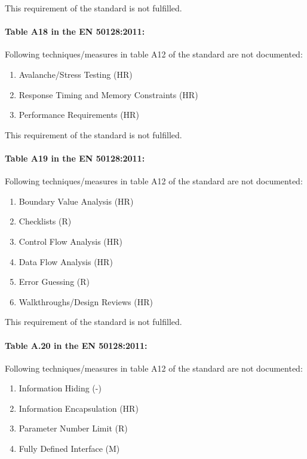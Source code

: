 This requirement of the standard is not fulfilled.

\paragraph{Table A18 in the EN 50128:2011:}
Following techniques/measures in table A12 of the standard are not documented:

\begin{enumerate}
\item	Avalanche/Stress Testing (HR)
\item	Response Timing and Memory Constraints (HR)
\item	Performance Requirements (HR)
\end{enumerate}

This requirement of the standard is not fulfilled.

\paragraph{Table A19 in the EN 50128:2011:}
Following techniques/measures in table A12 of the standard are not documented:

\begin{enumerate}
\item 	Boundary Value Analysis (HR)
\item 	Checklists (R)
\item 	Control Flow Analysis (HR)
\item 	Data Flow Analysis (HR)
\item 	Error Guessing (R)
\item 	Walkthroughs/Design Reviews (HR)
\end{enumerate}

This requirement of the standard is not fulfilled.

\paragraph{Table A.20 in the EN 50128:2011:}
Following techniques/measures in table A12 of the standard are not documented:
\begin{enumerate}
\item	Information Hiding (-)
\item	Information Encapsulation (HR)
\item	Parameter Number Limit (R)
\item	Fully Defined Interface (M)
\end{enumerate}

